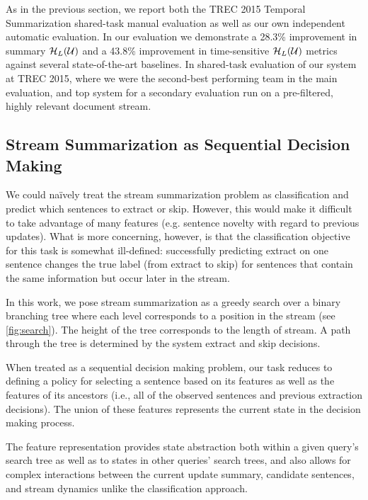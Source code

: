 As in the previous section,  we report both the TREC 2015 Temporal
Summarization shared-task manual evaluation as well as our own independent
automatic evaluation.  In our evaluation we demonstrate a 28.3\% improvement in
summary $\mathcal{H}_L(\mathcal{U})$ and a 43.8\% improvement in
time-sensitive $\mathcal{H}_L(\mathcal{U})$ metrics against several
state-of-the-art baselines.  In shared-task evaluation of our system at TREC
2015, where we were the second-best performing team in the main evaluation, and
top system for a secondary evaluation run on a pre-filtered, highly relevant
document stream.

\subsection{Stream Summarization as Sequential Decision Making}

We could na{\"i}vely treat the stream summarization problem as classification
and predict which sentences to extract or skip. However, this would make it
difficult to take advantage of many features (e.g. sentence novelty with regard
to previous updates).  What is more concerning, however, is that the
classification objective for this task is somewhat ill-defined: successfully
predicting extract on one sentence changes the true label (from extract to
skip) for sentences that contain the same information but occur later in the
stream.
 
In this work, we pose stream summarization as a greedy search over a binary
branching tree where each level corresponds to a position in the stream (see
\autoref{fig:search}).  The height of the tree corresponds to the length of
stream.  A path through the tree is determined by the system extract and skip
decisions.
 


When treated as a sequential decision making problem, our task reduces to
defining a policy for selecting a sentence based on its features as well as the
features of its ancestors (i.e., all of the observed sentences and previous
extraction decisions).  The union of these features represents the current
state in the decision making process. 

The feature representation provides state abstraction both within a given
query's search tree as well as to states in other queries' search trees, and
also allows for complex interactions between the current update summary,
candidate sentences, and stream dynamics unlike the classification approach.

